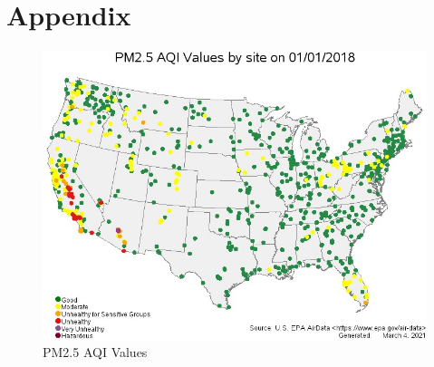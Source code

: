 \documentclass[sigconf,nonacm,11pt]{acmart}
\begin{document}
\pagebreak

\appendix
\section{Appendix}

\begin{figure}[!h]
    \centering
    \includegraphics[scale=0.4]{AQ_US_2018.jpg}
    \caption{PM2.5 AQI Values}
\end{figure}

\pagebreak






\appendix


\end{document}
